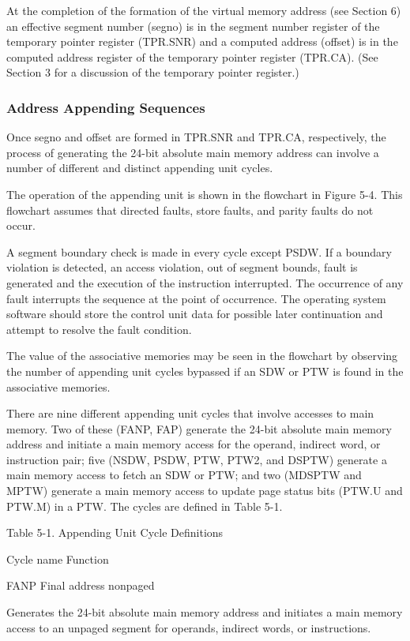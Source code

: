 At the completion of the formation of the virtual memory address (see Section
6) an effective segment number (segno) is in the segment number register of the
temporary pointer register (TPR.SNR) and a computed address (offset) is in the
computed address register of the temporary pointer register (TPR.CA). (See
Section 3 for a discussion of the temporary pointer register.)

\subsubsection{Address Appending Sequences}

Once segno and offset are formed in TPR.SNR and TPR.CA, respectively, the
process of generating the 24-bit absolute main memory address can involve a
number of different and distinct appending unit cycles.

The operation of the appending unit is shown in the flowchart in Figure 5-4.
This flowchart assumes that directed faults, store faults, and parity faults do
not occur.

A segment boundary check is made in every cycle except PSDW. If a boundary
violation is detected, an access violation, out of segment bounds, fault is
generated and the execution of the instruction interrupted. The occurrence of
any fault interrupts the sequence at the point of occurrence. The operating
system software should store the control unit data for possible later
continuation and attempt to resolve the fault condition.


The value of the associative memories may be seen in the flowchart by observing
the number of appending unit cycles bypassed if an SDW or PTW is found in the
associative memories.

There are nine different appending unit cycles that involve accesses to main
memory. Two of these (FANP, FAP) generate the 24-bit absolute main memory
address and initiate a main memory access for the operand, indirect word, or
instruction pair; five (NSDW, PSDW, PTW, PTW2, and DSPTW) generate a main
memory access to fetch an SDW or PTW; and two (MDSPTW and MPTW) generate a main
memory access to update page status bits (PTW.U and PTW.M) in a PTW. The cycles
are defined in Table 5-1.

Table 5-1. Appending Unit Cycle Definitions

Cycle name Function

FANP Final address nonpaged 

Generates the 24-bit absolute main memory address and initiates a main memory
access to an unpaged segment for operands, indirect words, or instructions.

